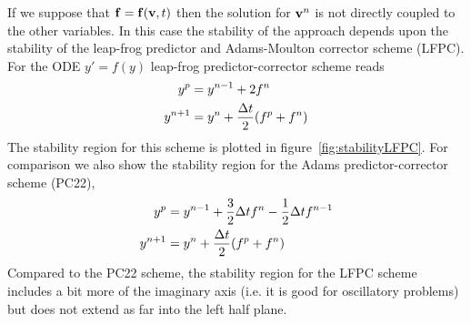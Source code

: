 If we suppose that $\mathbf{ f}=\mathbf{ f}(\mathbf{ v},t)$ then the solution for $\mathbf{ v}^n$ is not directly coupled
to the other variables. 
In this case the stability of the approach depends upon the stability of the leap-frog predictor and
Adams-Moulton corrector scheme (LFPC). 
For the ODE $y'=f(y)$ leap-frog predictor-corrector scheme reads
\begin{align*}
   y^p & = y^{n-1} + 2 f^n  \\
   y^{n+1} &= y^n + {{\Delta t}\over 2}( f^p + f^n)
\end{align*}
The stability region for this scheme is plotted in figure~\ref{fig:stabilityLFPC}.
For comparison we also show the stability region for the Adams predictor-corrector scheme (PC22),
\begin{align*}
   y^p & = y^{n-1} +  {3\over 2} {\Delta t} f^n - {1\over 2}{\Delta t} f^{n-1}  \\
   y^{n+1} &= y^n + {{\Delta t}\over 2}( f^p + f^n)
\end{align*}
Compared to the PC22 scheme, the stability region for the LFPC scheme includes a bit more
of the imaginary axis (i.e. it is good for oscillatory problems) but does not extend
as far into the left half plane. 
